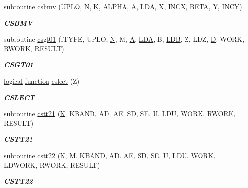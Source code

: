 \begin{DoxyCompactItemize}
subroutine \hyperlink{group__complex__eig_ga93ee535a3f54f2c0ea6d2da4f7d8fa84}{csbmv} (U\+P\+L\+O, \hyperlink{polmisc_8c_a0240ac851181b84ac374872dc5434ee4}{N}, K, A\+L\+P\+H\+A, \hyperlink{classA}{A}, \hyperlink{example__user_8c_ae946da542ce0db94dced19b2ecefd1aa}{L\+D\+A}, X, I\+N\+C\+X, B\+E\+T\+A, Y, I\+N\+C\+Y)
\begin{DoxyCompactList}\small\item\em {\bfseries C\+S\+B\+M\+V} \end{DoxyCompactList}\item 
subroutine \hyperlink{group__complex__eig_ga7ba73334a6847224855e1cd46190a57e}{csgt01} (I\+T\+Y\+P\+E, U\+P\+L\+O, \hyperlink{polmisc_8c_a0240ac851181b84ac374872dc5434ee4}{N}, M, \hyperlink{classA}{A}, \hyperlink{example__user_8c_ae946da542ce0db94dced19b2ecefd1aa}{L\+D\+A}, B, \hyperlink{example__user_8c_a50e90a7104df172b5a89a06c47fcca04}{L\+D\+B}, Z, L\+D\+Z, \hyperlink{odrpack_8h_a7dae6ea403d00f3687f24a874e67d139}{D}, W\+O\+R\+K, R\+W\+O\+R\+K, R\+E\+S\+U\+L\+T)
\begin{DoxyCompactList}\small\item\em {\bfseries C\+S\+G\+T01} \end{DoxyCompactList}\item 
\hyperlink{tnc_8c_aa7b64cdf39500931f7b333343791a104}{logical} \hyperlink{afunc_8m_a7b5e596df91eadea6c537c0825e894a7}{function} \hyperlink{group__complex__eig_ga0d9f3211db914cec239828108033783a}{cslect} (Z)
\begin{DoxyCompactList}\small\item\em {\bfseries C\+S\+L\+E\+C\+T} \end{DoxyCompactList}\item 
subroutine \hyperlink{group__complex__eig_ga1bad51cd5228d6748888b32aaa29b8e4}{cstt21} (\hyperlink{polmisc_8c_a0240ac851181b84ac374872dc5434ee4}{N}, K\+B\+A\+N\+D, A\+D, A\+E, S\+D, S\+E, U, L\+D\+U, W\+O\+R\+K, R\+W\+O\+R\+K, R\+E\+S\+U\+L\+T)
\begin{DoxyCompactList}\small\item\em {\bfseries C\+S\+T\+T21} \end{DoxyCompactList}\item 
subroutine \hyperlink{group__complex__eig_ga26e28ed198349b9824bd5809a4b72b8f}{cstt22} (\hyperlink{polmisc_8c_a0240ac851181b84ac374872dc5434ee4}{N}, M, K\+B\+A\+N\+D, A\+D, A\+E, S\+D, S\+E, U, L\+D\+U, W\+O\+R\+K, L\+D\+W\+O\+R\+K, R\+W\+O\+R\+K, R\+E\+S\+U\+L\+T)
\begin{DoxyCompactList}\small\item\em {\bfseries C\+S\+T\+T22} \end{DoxyCompactList}\item 

\end{DoxyCompactItemize}
